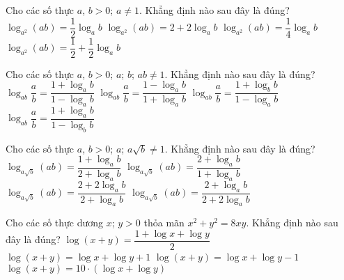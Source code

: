 \begin{ex}%
	Cho các số thực $a$, $b>0$; $a\neq 1$. Khẳng định nào sau đây là đúng?
	\choice
	{$\log_{a^2}(ab)=\dfrac{1}{2}\log_ab$}
	{$\log_{a^2}(ab)=2+2\log_ab$}
	{$\log_{a^2}(ab)=\dfrac{1}{4}\log_ab$}
	{\True $\log_{a^2}(ab)=\dfrac{1}{2}+\dfrac{1}{2}\log_ab$}
\end{ex}

\begin{ex}%
	Cho các số thực $a$, $b>0$; $a$; $b$; $ab\neq 1$. Khẳng định nào sau đây là đúng?
	\choice
	{$\log_{ab}\dfrac{a}{b}=\dfrac{1+\log_ab}{1-\log_ab}$}
	{\True $\log_{ab}\dfrac{a}{b}=\dfrac{1-\log_ab}{1+\log_ab}$}
	{$\log_{ab}\dfrac{a}{b}=\dfrac{1+\log_bb}{1-\log_ab}$}
	{$\log_{ab}\dfrac{a}{b}=\dfrac{1+\log_ab}{1-\log_bb}$}
\end{ex}

\begin{ex}%
	Cho các số thực $a$, $b>0$; $a$; $a\sqrt{b}\neq 1$. Khẳng định nào sau đây là đúng?
	\choice
	{$\log_{a\sqrt{b}}(ab)=\dfrac{1+\log_ab}{2+\log_ab}$}
	{$\log_{a\sqrt{b}}(ab)=\dfrac{2+\log_ab}{1+\log_ab}$}
	{\True $\log_{a\sqrt{b}}(ab)=\dfrac{2+2\log_ab}{2+\log_ab}$}
	{$\log_{a\sqrt{b}}(ab)=\dfrac{2+\log_ab}{2+2\log_ab}$}
\end{ex}

\begin{ex}%
	Cho các số thực dương $x$; $y>0$ thỏa mãn $x^2+y^2=8xy$. Khẳng định nào sau đây là đúng?
	\choice
	{\True $\log(x+y)=\dfrac{1+\log x+\log y}{2}$}
	{$\log(x+y)=\log x+\log y+1$}
	{$\log(x+y)=\log x+\log y-1$}
	{$\log(x+y)=10\cdot\left(\log x+\log y\right)$}
\end{ex}

